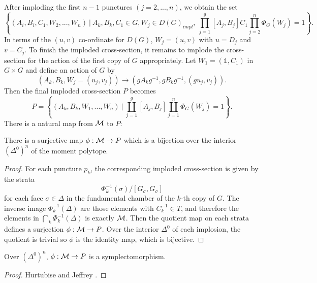 	After imploding the first $n-1$ punctures $(j=2,...,n)$, we obtain the set
	\begin{equation}
		\left\{
		(A_i,B_i,C_1,W_2,...,W_n)~|~ A_k,B_k,C_1 \in G, W_j \in D(G)_{impl},~ \prod_{j=1}^{g}[A_j,B_j]C_1\prod_{j=2}^{n} \Phi_G(W_j) = 1 
		\right\}.
	\end{equation}
	In terms of the $(u,v)$ co-ordinate for $D(G)$, $W_j = (u,v)$ with $u=D_j$ and $v = C_j$. To finish the imploded cross-section, it remains to implode the cross-section for the action of the first copy of $G$ appropriately. Let $W_1 = (\mathds{1},C_1)$ in $G\times G$ and define an action of $G$ by
	\begin{equation}
		\label{e:first-action}
		\left(A_k,B_k,W_j=(u_j,v_j)\right) \to (gA_kg^{-1}, gB_kg^{-1}, (gu_j,v_j)).
	\end{equation}
	Then the final imploded cross-section $P$ becomes \cite{hurtubise_representations_2000}
	\begin{equation}
		\label{e:P-def}
		P = \left\{(A_k,B_k,W_1,...,W_n)~|~ \coprod_{j=1}^g[A_j,B_j]\coprod_{j=1}^n \Phi_G(W_j)=1\right\}.
	\end{equation}
	There is a natural map from $\mathcal{M}$ to $P$:
	\begin{lemma}
		There is a surjective map $\phi:\mathcal{M}\to P$ which is a bijection over the interior $(\Delta^0)^n$ of the moment polytope. 
	\end{lemma}
	\begin{proof}
		For each puncture $p_k$, the corresponding imploded cross-section is given by the strata
		\begin{equation}
			\Phi_k^{-1}(\sigma)/[G_\sigma, G_\sigma]
		\end{equation}
		for each face $\sigma \in \Delta$ in the fundamental chamber of the $k$-th copy of $G$. The inverse image $\Phi_k^{-1}(\Delta)$ are those elements with $C_k^{-1} \in T$, and therefore the elements in $\bigcap_k \Phi_k^{-1} (\Delta)$ is exactly $\mathcal{M}$. Then the quotient map on each strata defines a surjection $\phi:\mathcal{M}\to P$. Over the interior $\Delta^0$ of each implosion, the quotient is trivial so $\phi$ is the identity map, which is bijective. 
	\end{proof}
	\begin{theorem}
		Over $(\Delta^0)^n$, $\phi:\mathcal{M} \to P$ is a symplectomorphism.
	\end{theorem}
	\begin{proof}
		Hurtubise and Jeffrey \cite[Proposition 2.37]{hurtubise_representations_2000}.
	\end{proof}
	

